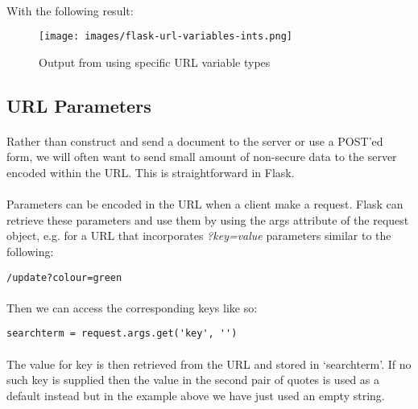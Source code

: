 \documentclass[12pt, a4paper, twoside]{book}
\begin{document}
\paragraph{} With the following result:

\begin{figure}[H]
\centering
\texttt{[image: images/flask-url-variables-ints.png]}
\caption{Output from using specific URL variable types}
\label{fig:flask-url-variables-ints}
\end{figure}



\subsection{URL Parameters}
\label{url-parameters}
\paragraph{} Rather than construct and send a document to the server or use a POST'ed form, we will often want to send small amount of non-secure data to the server encoded within the URL. This is straightforward in Flask. 

\paragraph{} Parameters can be encoded in the URL when a client make a request. Flask can retrieve these parameters and use them by using the args attribute of the request object, e.g. for a URL that incorporates \emph{?key=value} parameters similar to the following:

\begin{lstlisting}[style=DOS]
/update?colour=green
\end{lstlisting}

\paragraph{} Then we can access the corresponding keys like so:

\begin{lstlisting}
searchterm = request.args.get('key', '')
\end{lstlisting}

\paragraph{} The value for key is then retrieved from the URL and stored in `searchterm'. If no such key is supplied then the value in the second pair of quotes is used as a default instead but in the example above we have just used an empty string.
\end{document}
